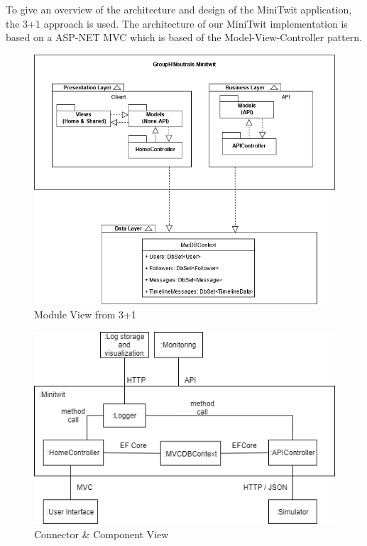 \documentclass{article}
\begin{document}
To give an overview of the architecture and design of the MiniTwit application, the 3+1 approach is used.
The architecture of our MiniTwit implementation is based on a ASP-NET MVC which is based of the Model-View-Controller pattern. 



\begin{figure}[H]
\centering
\includegraphics[width=1.1\textwidth]{images/Module View (3+1).png}
\caption{\label{fig:modview} Module View from 3+1}
\end{figure}

\begin{figure}[H]
\centering
\includegraphics[width=1.1\textwidth]{images/Connector & Component View Point.png}
\caption{\label{fig:modview}Connector & Component View}
\end{figure}
\end{document}
